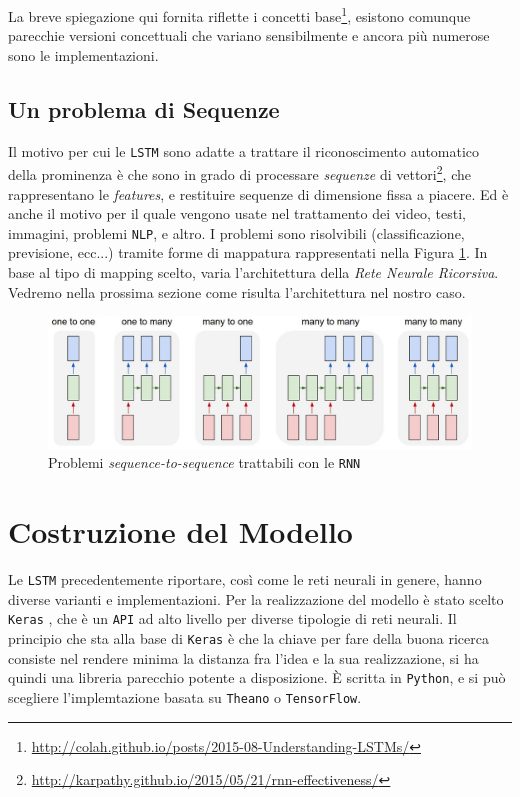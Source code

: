 \documentclass[twoside,twocolumn,10pt]{extarticle}
\theoremstyle{definition}
\begin{document}
		La breve spiegazione qui fornita riflette i concetti base\footnote{\url{http://colah.github.io/posts/2015-08-Understanding-LSTMs/}}, esistono comunque parecchie versioni concettuali che variano sensibilmente e ancora più numerose sono le implementazioni.
		
	\subsection{Un problema di Sequenze}
		Il motivo per cui le \texttt{LSTM} sono adatte a trattare il riconoscimento automatico della prominenza è che sono in grado di processare \textit{sequenze} di vettori\footnote{\url{http://karpathy.github.io/2015/05/21/rnn-effectiveness/}}, che rappresentano le \textit{features}, e restituire sequenze di dimensione fissa a piacere. Ed è anche il motivo per il quale vengono usate nel trattamento dei video, testi, immagini, problemi \texttt{NLP}, e altro. I problemi sono risolvibili (classificazione, previsione, ecc...) tramite forme di mappatura rappresentati nella Figura \ref{fig:seqs}.	In base al tipo di mapping scelto, varia l'architettura della \textit{Rete Neurale Ricorsiva}. Vedremo nella prossima sezione come risulta l'architettura nel nostro caso.
		
		\begin{figure}[h]
			\centering
			\includegraphics[scale=.3]{img/seqs.jpeg}
			\caption{Problemi \textit{sequence-to-sequence} trattabili con le \texttt{RNN}}
			\label{fig:seqs}
		\end{figure}

\section{Costruzione del Modello}\label{sec:building}
	Le \texttt{LSTM} precedentemente riportare, così come le reti neurali in genere, hanno diverse varianti e implementazioni. Per la realizzazione del modello è stato scelto \texttt{Keras} \cite{bib:chollet2015keras}, che è un \texttt{API} ad alto livello per diverse tipologie di reti neurali. Il principio che sta alla base di \texttt{Keras} è che la chiave per fare della buona ricerca consiste nel rendere minima la distanza fra l'idea e la sua realizzazione, si ha quindi una libreria parecchio potente a disposizione. È scritta in \texttt{Python}, e si può scegliere l'implemtazione basata su \texttt{Theano} o \texttt{TensorFlow}.
	
\end{document}
